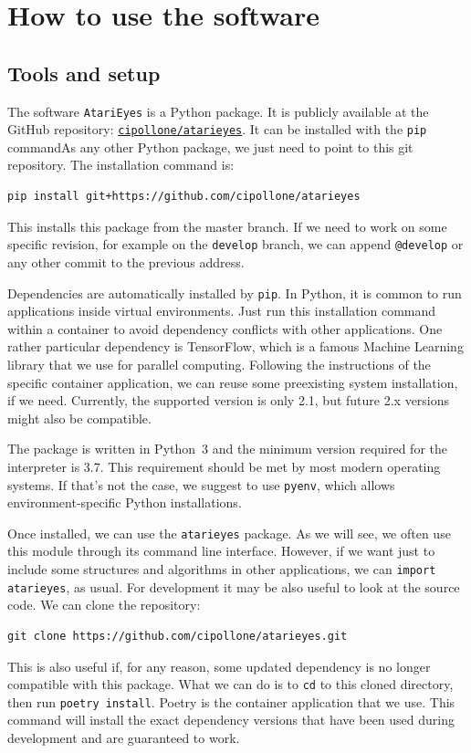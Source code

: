 \section{How to use the software}

\label{sec:how-to-use}

\subsection{Tools and setup}

The software \texttt{AtariEyes} is a Python package. It is publicly available
at the GitHub repository:
\href{https://github.com/cipollone/atarieyes}{\texttt{cipollone/atarieyes}}.
It can be installed with the \texttt{pip} commandAs any other Python package,
we just need to point to this git repository. The installation
command is:
\begin{lstlisting}[style=bash]
pip install git+https://github.com/cipollone/atarieyes
\end{lstlisting}
This installs this package from the master branch. If we need to work on some
specific revision, for example on the \texttt{develop} branch, we can append
\verb!@develop! or any other commit to the previous address.

Dependencies are automatically installed by \texttt{pip}.  In Python, it is
common to run applications inside virtual environments. Just run this
installation command within a container to avoid dependency conflicts with
other applications. One rather particular dependency is TensorFlow, which is a
famous Machine Learning library that we use for parallel computing. Following
the instructions of the specific container application, we can reuse some
preexisting system installation, if we need. Currently, the supported version
is only 2.1, but future 2.x versions might also be compatible.

The package is written in Python~3 and the minimum version required for the
interpreter is 3.7. This requirement should be met by most modern operating
systems. If that's not the case, we suggest to use \texttt{pyenv}, which
allows environment-specific Python installations.

Once installed, we can use the \texttt{atarieyes} package. As we will see, we
often use this module through its command line interface. However, if we want
just to include some structures and algorithms in other applications, we can
\lstinline[style=inlinepy]|import atarieyes|, as usual. For development it may
be also useful to look at the source code. We can clone the repository:
\begin{lstlisting}[style=bash]
git clone https://github.com/cipollone/atarieyes.git
\end{lstlisting}
This is also useful if, for any reason, some updated dependency is no longer
compatible with this package. What we can do is to \texttt{cd} to this cloned
directory, then run \texttt{poetry install}. Poetry is the container
application that we use. This command will install the exact dependency
versions that have been used during development and are guaranteed to work.


